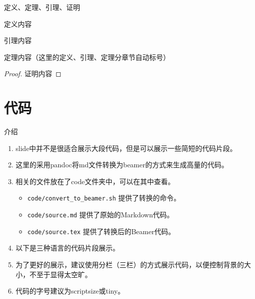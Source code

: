 \documentclass[aspectratio=169]{beamer}
\begin{document}
\begin{frame}{定义、定理、引理、证明}
    \begin{define}[定义名称]
        定义内容
    \end{define}
    \begin{lem}[引理名称]
        引理内容
    \end{lem}
    \begin{thm}[定理名称]
        定理内容（这里的定义、引理、定理分章节自动标号）
    \end{thm}
    \begin{proof}
        证明内容
    \end{proof}
\end{frame}

\section{代码}

\begin{frame}{介绍}
    \begin{enumerate}
        \item slide中并不是很适合展示大段代码，但是可以展示一些简短的代码片段。
        \item 这里的采用pandoc将md文件转换为beamer的方式来生成高量的代码。
        \item 相关的文件放在了code文件夹中，可以在其中查看。
        \begin{itemize}
            \item \texttt{code/convert\_to\_beamer.sh} 提供了转换的命令。
            \item \texttt{code/source.md} 提供了原始的Markdown代码。
            \item \texttt{code/source.tex} 提供了转换后的Beamer代码。
        \end{itemize}
        \item 以下是三种语言的代码片段展示。
        \item 为了更好的展示，建议使用分栏（三栏）的方式展示代码，以便控制背景的大小，不至于显得太空旷。
        \item 代码的字号建议为scriptsize或tiny。
    \end{enumerate}
\end{frame}
\end{document}
